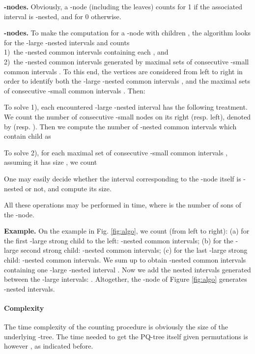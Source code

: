 \documentclass{article}
\begin{document}
{\bf -nodes.} Obviously, a -node (including the leaves) counts for 1 if the associated interval is -nested, and for 0 otherwise.

{\bf -nodes.} To make the computation for a -node with children  , the algorithm looks for 
the -large -nested intervals   and counts\\
1)~the -nested common intervals containing each ,
and\\
2)~the -nested common intervals generated by maximal sets of consecutive -small common intervals 
.  To this end, the vertices  are considered from left to right in order to identify 
both the -large -nested common intervals ,
and the maximal sets of consecutive -small common intervals 
. Then: 

To solve 1), each encountered -large -nested interval  has the following treatment. We 
count the number of consecutive -small nodes  on its right (resp. left), denoted by
 (resp. ).  Then we compute the number of -nested common intervals
which contain child  as   

To solve 2),  for each maximal set of consecutive -small common intervals 
, assuming it has size , we count  

One may easily decide whether the interval corresponding
to the -node itself is -nested or not, and compute its size. 

All these operations may be performed in  time, where  is the number of sons of the -node.
\bigskip

{\bf Example.} On the
example in Fig. \ref{fig:algo}, we count (from left to right): (a)
for the first -large strong child to the left:  -nested common
intervals; (b) for the -large second strong child:  -nested common
intervals; (c) for the last -large strong child:  -nested common
intervals. We sum up to obtain  -nested common intervals containing one -large -nested
interval . Now we add the nested intervals generated between the -large intervals: 
. Altogether, the -node of Figure \ref{fig:algo} generates  -nested intervals.

\paragraph{Complexity} The time complexity of the counting procedure is obviously  the size of the underlying -tree. The time needed to get the PQ-tree itself given  permutations is however , as indicated before.
\end{document}
